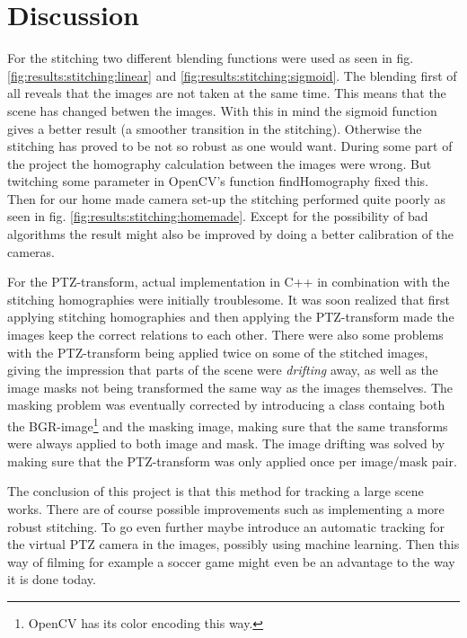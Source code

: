 \section{Discussion}
For the stitching two different blending functions were used as seen in fig. \ref{fig:results:stitching:linear} and \ref{fig:results:stitching:sigmoid}.
The blending first of all reveals that the images are not taken at the same time.
This means that the scene has changed betwen the images.
With this in mind the sigmoid function gives a better result (a smoother transition in the stitching).
Otherwise the stitching has proved to be not so robust as one would want.
During some part of the project the homography calculation between the images were wrong.
But twitching some parameter in OpenCV's function findHomography fixed this.
Then for our home made camera set-up the stitching performed quite poorly as seen in fig. \ref{fig:results:stitching:homemade}.
Except for the possibility of bad algorithms the result might also be improved by doing a better calibration of the cameras.

For the PTZ-transform, actual implementation in C++ in combination with the stitching homographies were initially troublesome.
It was soon realized that first applying stitching homographies and then applying the PTZ-transform made the images keep the correct relations to each other.
There were also some problems with the PTZ-transform being applied twice on some of the stitched images, giving the impression that parts of the scene were {\it drifting} away, as well as the image masks not being transformed the same way as the images themselves.
The masking problem was eventually corrected by introducing a class containg both the BGR-image\footnote{OpenCV has its color encoding this way.} and the masking image, making sure that the same transforms were always applied to both image and mask.
The image drifting was solved by making sure that the PTZ-transform was only applied once per image/mask pair.

The conclusion of this project is that this method for tracking a large scene works.
There are of course possible improvements such as implementing a more robust stitching.
To go even further maybe introduce an automatic tracking for the virtual PTZ camera in the images, possibly using machine learning.
Then this way of filming for example a soccer game might even be an advantage to the way it is done today.
